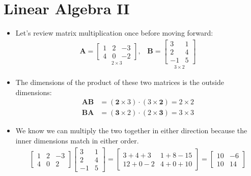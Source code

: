 \section{Linear Algebra II}

\begin{itemize}

    \item Let's review matrix multiplication once before moving forward:
    \begin{align*}
        \bm{A} = 
        \underset{2 \times 3}{\begin{bmatrix}
            1 & 2 & -3 \\
            4 & 0 & -2   
        \end{bmatrix}},
        \; \; \; 
        \bm{B} =
        \underset{3 \times 2}{\begin{bmatrix}
            3 & 1 \\
            2 & 4 \\
            -1 & 5
        \end{bmatrix}}
    \end{align*}
    
    \item The dimensions of the product of these two matrices is the outside dimensions:
    \begin{align*}
        \bm{A}\bm{B} & = (\bm{2} \times 3) \cdot (3 \times \bm{2}) = 2 \times 2 \\ 
        \bm{B}\bm{A} & = (\bm{3} \times 2) \cdot (2 \times \bm{3}) = 3 \times 3
    \end{align*}

    \item We know we can multiply the two together in either direction because the inner dimensions match in either order.
    \begin{align*}
        \begin{bmatrix}
            1 & 2 & -3 \\
            4 & 0 & 2
        \end{bmatrix}
        \begin{bmatrix}
            3 & 1 \\
            2 & 4 \\
            -1 & 5
        \end{bmatrix}
        = 
        \begin{bmatrix}
            3 + 4 + 3 & 1 + 8 -15 \\
            12 + 0 -2 & 4 + 0 + 10
        \end{bmatrix}
        = 
        \begin{bmatrix}
            10 & -6 \\
            10 & 14
        \end{bmatrix}
    \end{align*}


\end{itemize}

